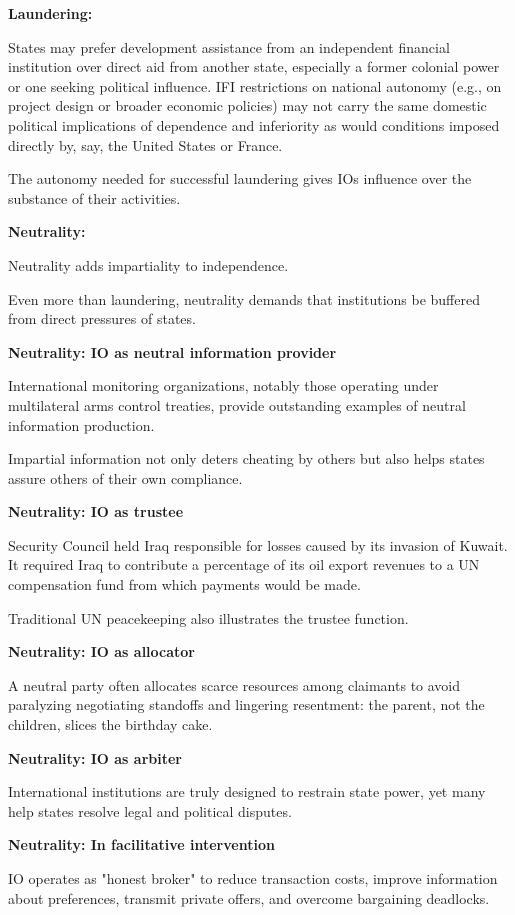 \textbf{Laundering:}

States may prefer development assistance from an independent financial institution over direct aid from another state, especially a former colonial power or one seeking political influence. IFI restrictions on national autonomy (e.g., on project design or broader economic policies) may not carry the same domestic political implications of dependence and inferiority as would conditions imposed directly by, say, the United States or France.

The autonomy needed for successful laundering gives IOs influence over the substance of their activities.

\textbf{Neutrality:}

Neutrality adds impartiality to independence.

Even more than laundering, neutrality demands that institutions be buffered from direct pressures of states.

\textbf{Neutrality: IO as neutral information provider}

International monitoring organizations, notably those operating under multilateral arms control treaties, provide outstanding examples of neutral information production.

Impartial information not only deters cheating by others but
also helps states assure others of their own compliance.

\textbf{Neutrality: IO as trustee}

Security Council held Iraq responsible for losses caused by its invasion of Kuwait. It required Iraq to contribute a percentage of its oil export revenues to a UN compensation fund from which payments would be made.

Traditional UN peacekeeping also illustrates the trustee function.

\textbf{Neutrality: IO as allocator}

A neutral party often allocates scarce resources among claimants to avoid paralyzing negotiating standoffs and lingering resentment: the parent, not the children, slices the birthday cake.

\textbf{Neutrality: IO as arbiter}

International institutions are truly designed to restrain state power, yet many help states resolve legal and political disputes.

\textbf{Neutrality: In facilitative intervention}

IO operates as "honest broker" to reduce transaction costs, improve information about preferences, transmit private offers, and overcome bargaining deadlocks.


